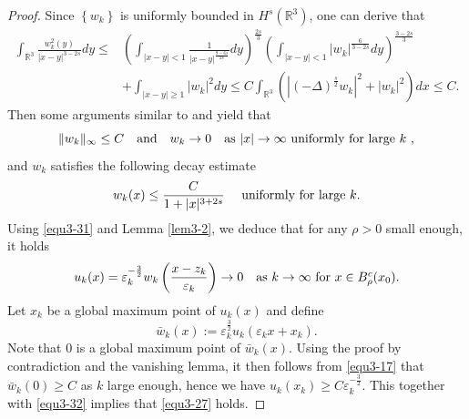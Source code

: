 \documentclass[reqno, 11pt]{amsart} %
\numberwithin{equation}{section}
\begin{document}
	\begin{proof}
		Since $\left\lbrace w_{k}\right\rbrace $ is uniformly bounded in $H^{s}(\mathbb{R}^{3})$, one can derive that
		\begin{equation}\label{equ3-29}
			\begin{split}
				\int_{\mathbb{R}^{3}}\frac{w^{2}_{k}(y)}{|x-y|^{3-2s}}dy\leq& \left(\int_{|x-y|<1}\frac{1}{|x-y|^{\frac{9-6s}{2s}}}dy\right)^{\frac{2s}{3}}\left(\int_{|x-y|<1}|w_{k}|^{\frac{6}{3-2s}}dy\right)^{\frac{3-2s}{3}}\\
				&+\int_{|x-y|\geq1}|w_{k}|^{2}dy\leq C\int_{\mathbb{R}^{3}}\left(|(-\Delta)^{\frac{s}{2}} w_{k}|^{2}+|w_{k}|^{2}\right)dx\leq C.
			\end{split}
		\end{equation}
		Then some arguments similar to \cite[Lemma 2.4]{DD} and \cite[Lemma 5.6]{TT} yield that
		\begin{equation}\label{equ3-30}
			\|w_{k}\|_{\infty}\leq C\quad \mathrm {and} \quad w_{k} \rightarrow 0  \quad\hbox{as $|x| \rightarrow \infty$ uniformly for large $k$ },
		\end{equation}
		and $w_{k}$ satisfies the following decay estimate
		\begin{equation}\label{equ3-31}
			w_{k}(x)\leq\frac{C}{1+|x|^{3+2s}}\quad \hbox{ uniformly for large $k$}.
		\end{equation}
		Using \eqref{equ3-31} and Lemma \ref{lem3-2}, we deduce that for any $\rho>0$ small enough, it holds
		\begin{equation}\label{equ3-32}
			u_{k}(x)=\varepsilon_{k}^{-\frac{3}{2}}w_{k}\left(\frac{x-z_{k}}{\varepsilon_{k}}\right)\rightarrow 0\quad\hbox{as $k\rightarrow\infty$ for $x\in B_{\rho}^{c}(x_{0})$}.
		\end{equation}
		Let $x_{k}$ be a global maximum point of $u_{k}(x)$ and define
		\begin{equation}\label{equ3-33}
			\bar{w}_{k}(x):=\varepsilon_{k}^{\frac{3}{2}}u_{k}(\varepsilon_{k}x+x_{k}).
		\end{equation}
		Note that $0$ is a global maximum point of $\bar{w}_{k}(x)$. Using the proof by contradiction and the vanishing lemma, it then follows from \eqref{equ3-17} that $	\bar{w}_{k}(0)\geq C$
		as $k$ large enough, hence we have $u_{k}(x_{k})\geq C\varepsilon_{k}^{-\frac{3}{2}}$. This together with \eqref{equ3-32} implies that \eqref{equ3-27} holds.
		

\end{proof}
\end{document}
